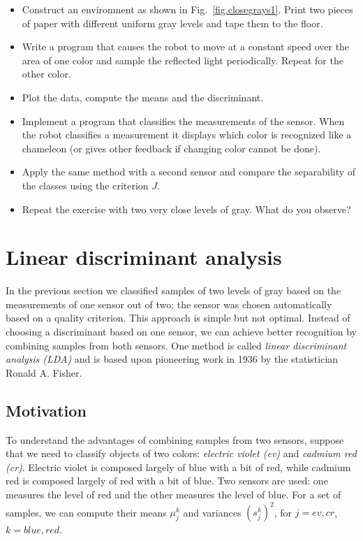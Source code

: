\begin{framed}
\begin{itemize}
\item Construct an environment as shown in Fig.~\ref{fig.closegrays1}. Print two pieces of paper with different uniform gray levels and tape them to the floor.
\item Write a program that causes the robot to move at a constant speed over the area of one color and sample the reflected light periodically. Repeat for the other color.
\item Plot the data, compute the means and the discriminant.
\item Implement a program that classifies the measurements of the sensor. When the robot classifies a measurement it displays which color is recognized like a chameleon (or gives other feedback if changing color cannot be done).
\item Apply the same method with a second sensor and compare the separability of the classes using the criterion $J$.
\item Repeat the exercise with two very close levels of gray. What do you observe?
\end{itemize}
\end{framed}

\section{Linear discriminant analysis}\label{s.lda}


In the previous section we classified samples of two levels of gray based on the measurements of one sensor out of two; the sensor was chosen automatically based on a quality criterion. This approach is simple but not optimal. Instead of choosing a discriminant based on one sensor, we can achieve better recognition by combining samples from both sensors. One method is called \emph{linear discriminant analysis (LDA)} and is based upon pioneering work in 1936 by the statistician Ronald A. Fisher.

\subsection{Motivation}

To understand the advantages of combining samples from two sensors, suppose that we need to classify objects of two colors: \emph{electric violet (ev)} and \emph{cadmium red (cr)}. Electric violet is composed largely of blue with a bit of red, while cadmium red is composed largely of red with a bit of blue. Two sensors are used: one measures the level of red and the other measures the level of blue. For a set of samples, we can compute their means $\mu_j^k$ and variances $(s_j^k)^2$, for $j=\mathit{ev}, \mathit{cr}$, $k=\mathit{blue}, \mathit{red}$.

